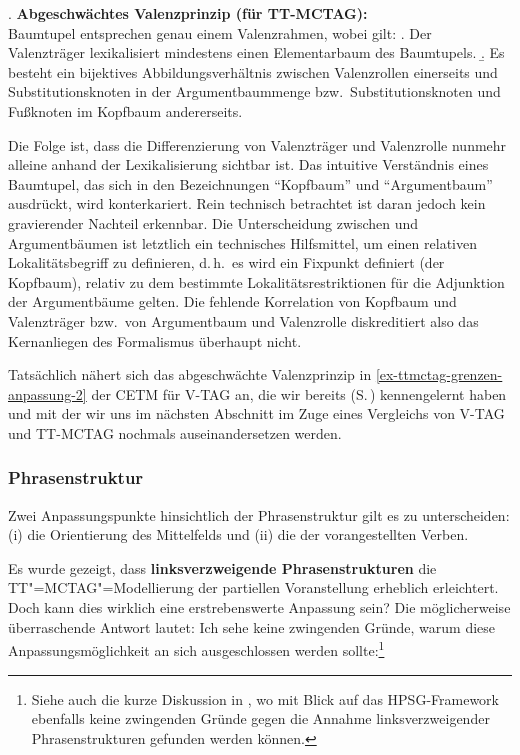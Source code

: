 \ex. {\bf Abgeschwächtes Valenzprinzip (für TT-MCTAG):}\label{ex-ttmctag-grenzen-anpassung-2}\\
Baumtupel entsprechen genau einem Valenzrahmen, wobei gilt:
\a. Der Valenzträger lexikalisiert mindestens einen Elementarbaum des Baumtupels.
\b. Es besteht ein bijektives Abbildungsverhältnis zwischen Valenzrollen einerseits und Substitutionsknoten in der Argumentbaummenge bzw.\ Substitutionsknoten und Fu\ss knoten im Kopfbaum andererseits.

Die Folge ist, dass die Differenzierung von Valenzträger und Valenzrolle nunmehr alleine anhand der Lexikalisierung sichtbar ist. Das intuitive Verständnis eines Baumtupel, das sich in den Bezeichnungen "`Kopfbaum"' und "`Argumentbaum"' ausdrückt, wird konterkariert. Rein technisch betrachtet ist daran jedoch kein gravierender Nachteil erkennbar. Die Unterscheidung zwischen  und Argumentbäumen ist letztlich ein technisches Hilfsmittel, um einen relativen Lokalitätsbegriff zu definieren, d.\,h.\ es wird ein Fixpunkt definiert (der Kopfbaum), relativ zu dem bestimmte Lokalitätsrestriktionen für die Adjunktion der Argumentbäume gelten. Die fehlende Korrelation von Kopfbaum und Valenzträger bzw.\ von Argumentbaum und Valenzrolle diskreditiert also das Kernanliegen des Formalismus überhaupt nicht. 

Tatsächlich nähert sich das abgeschwächte Valenzprinzip in \ref{ex-ttmctag-grenzen-anpassung-2} der CETM für V-TAG an, die wir bereits (S.\,\pageref{sec-tag-varianten-vtag}) kennengelernt haben und mit der wir uns im nächsten Abschnitt im Zuge eines Vergleichs von V-TAG und TT-MCTAG nochmals auseinandersetzen werden.  


 

\subsubsection*{Phrasenstruktur}

Zwei Anpassungspunkte hinsichtlich der Phrasenstruktur gilt es zu unterscheiden: (i) die Orientierung des Mittelfelds und (ii) die  der vorangestellten Verben.

Es wurde gezeigt, dass {\bf linksverzweigende Phrasenstrukturen} die TT"=MCTAG"=Modellierung der partiellen Voranstellung erheblich erleichtert. Doch kann dies wirklich eine erstrebenswerte Anpassung sein? Die möglicherweise überraschende Antwort lautet: Ich sehe keine zwingenden Gründe, warum diese Anpassungsmöglichkeit an sich ausgeschlossen werden sollte:\footnote{Siehe auch die kurze Diskussion in \cite{Crysmann:03}, wo mit Blick auf das HPSG-Framework ebenfalls keine zwingenden Gründe gegen die Annahme linksverzweigender Phrasenstrukturen gefunden werden können.}

